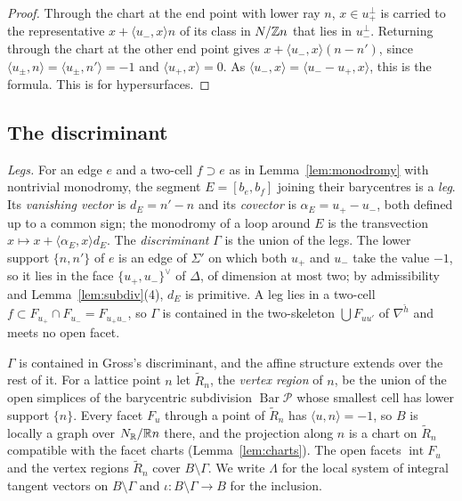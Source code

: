 \begin{proof}
Through the chart at the end point with lower ray $n$, $x\in u_+^\perp$ is carried to the representative
$x+\langle u_-,x\rangle n$ of its class in $N/\mathbb Z n$ that lies in $u_-^\perp$. Returning through the chart at the other end point
gives $x+\langle u_-,x\rangle(n-n')$, since $\langle u_\pm,n\rangle=\langle u_\pm,n'\rangle=-1$ and $\langle u_+,x\rangle=0$. As
$\langle u_-,x\rangle=\langle u_--u_+,x\rangle$, this is the formula. This is \cite[Prop.~3.15]{Gross2005} for hypersurfaces.
\end{proof}

\subsection{The discriminant}\label{ssec:disc}
\emph{Legs.} For an edge $e$ and a two-cell $f\supset e$ as in Lemma~\ref{lem:monodromy} with nontrivial monodromy, the
segment $E=[b_e,b_f]$ joining their barycentres is a \emph{leg}. Its \emph{vanishing vector} is $d_E=n'-n$ and its
\emph{covector} is $\alpha_E=u_+-u_-$, both defined up to a common sign; the monodromy of a loop around $E$ is the transvection
$x\mapsto x+\langle\alpha_E,x\rangle d_E$. The \emph{discriminant} $\Gamma$ is the union of the legs. The lower support
$\{n,n'\}$ of $e$ is an edge of $\Sigma'$ on which both $u_+$ and $u_-$ take the value $-1$, so it lies in the face
$\{u_+,u_-\}^\vee$ of $\Delta$, of dimension at most two; by admissibility and Lemma~\ref{lem:subdiv}(4), $d_E$ is primitive.
A leg lies in a two-cell $f\subset F_{u_+}\cap F_{u_-}=F_{u_+u_-}$, so $\Gamma$ is contained in the two-skeleton
$\bigcup F_{uu'}$ of $\nabla^{\check h}$ and meets no open facet.

$\Gamma$ is contained in Gross's discriminant, and the affine structure extends over the rest of it. For a lattice point $n$
let $\widetilde R_n$, the \emph{vertex region} of $n$, be the union of the open simplices of the barycentric subdivision
$\operatorname{Bar}\mathscr P$ whose smallest cell has lower support $\{n\}$. Every facet $F_u$ through a point of
$\widetilde R_n$ has $\langle u,n\rangle=-1$, so $B$ is locally a graph over $N_\mathbb R/\mathbb R n$ there, and the projection along $n$ is a
chart on $\widetilde R_n$ compatible with the facet charts (Lemma~\ref{lem:charts}). The open facets $\operatorname{int}F_u$
and the vertex regions $\widetilde R_n$ cover $B\setminus\Gamma$. We write $\Lambda$ for the local system of integral tangent
vectors on $B\setminus\Gamma$ and $\iota\colon B\setminus\Gamma\to B$ for the inclusion.

